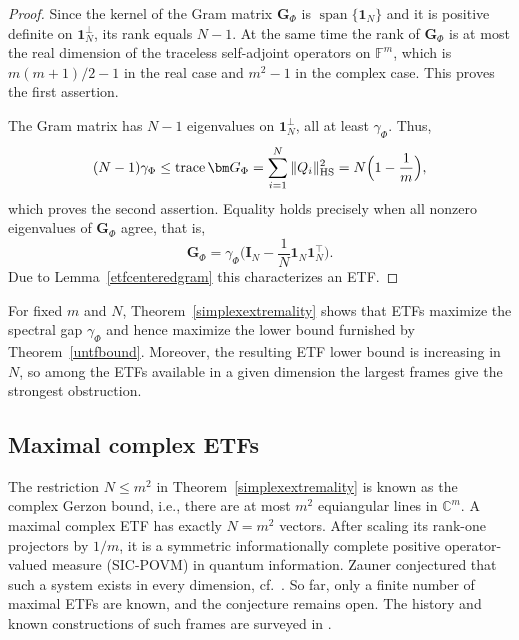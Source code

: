 \documentclass[a4paper]{amsart}
\numberwithin{equation}{section}
\DeclareMathOperator{\trace}{trace}
\DeclareMathOperator{\Span}{span}
\begin{document}
\begin{proof}
    Since the kernel of the Gram matrix $\bm G_\Phi$ is $\Span\{\bm 1_N\}$ and it is positive definite on $\bm 1_N^\perp$, its rank equals $N-1$.
    At the same time the rank of $\bm G_\Phi$ is at most the real dimension of the traceless self-adjoint operators on $\mathds F^m$, which is $m(m+1)/2-1$ in the real case and $m^2-1$ in the complex case.
    This proves the first assertion.

    The Gram matrix has $N-1$ eigenvalues on $\bm 1_N^\perp$, all at least $\gamma_\Phi$.
    Thus,
    \begin{equation*}
        (N-1)\gamma_\Phi \le \trace\bm G_\Phi
        = \sum_{i=1}^N\|Q_i\|_{\rm HS}^2
        = N\Big(1-\frac1m\Big) ,
    \end{equation*}
    which proves the second assertion.
    Equality holds precisely when all nonzero eigenvalues of $\bm G_\Phi$ agree, that is,
    \begin{equation*}
        \bm G_\Phi
        =\gamma_\Phi
        \Big(\bm I_N-\frac1N\bm 1_N\bm 1_N^\top\Big).
    \end{equation*}
    Due to Lemma~\ref{etfcenteredgram} this characterizes an ETF.
\end{proof}

For fixed $m$ and $N$, Theorem~\ref{simplexextremality} shows that ETFs maximize the spectral gap $\gamma_\Phi$ and hence maximize the lower bound furnished by Theorem~\ref{untfbound}.
Moreover, the resulting ETF lower bound is increasing in $N$, so among the ETFs available in a given dimension the largest frames give the strongest obstruction.



\subsection{Maximal complex ETFs}

The restriction $N\le m^2$ in Theorem~\ref{simplexextremality} is known as the complex Gerzon bound, i.e., there are at most $m^2$ equiangular lines in $\mathds C^m$.
A maximal complex ETF has exactly $N=m^2$ vectors.
After scaling its rank-one projectors by $1/m$, it is a symmetric informationally complete positive operator-valued measure (SIC-POVM) in quantum information.
Zauner conjectured that such a system exists in every dimension, cf.~\cite{Zauner99}.
So far, only a finite number of maximal ETFs are known, and the conjecture remains open.
The history and known constructions of such frames are surveyed in \cite{FM15, FHS17}.
\end{document}
